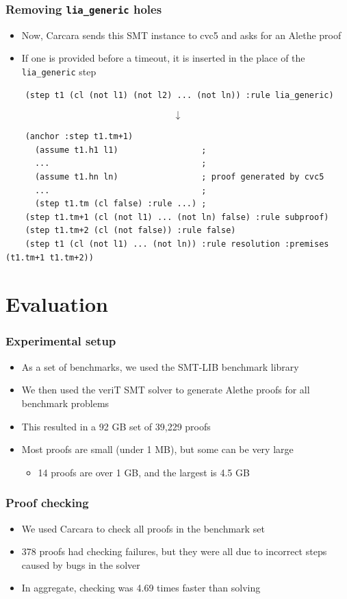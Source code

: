 \documentclass[usepdftitle=false,aspectratio=169]{beamer}
\newcommand\vitem{\vfill\item}
\begin{document}
\begin{frame}[fragile]
  \frametitle{Removing \texttt{lia\_generic} holes}
  \begin{itemize}
    \item Now, Carcara sends this SMT instance to cvc5 and asks for an Alethe
    proof
    \vitem If one is provided before a timeout, it is inserted in the place of
    the \texttt{lia\_generic} step
  \end{itemize}
  \vfill
  \begin{verbatim}
    (step t1 (cl (not l1) (not l2) ... (not ln)) :rule lia_generic)
  \end{verbatim}
  $$\downarrow$$
  \begin{verbatim}
    (anchor :step t1.tm+1)
      (assume t1.h1 l1)                 ;
      ...                               ;
      (assume t1.hn ln)                 ; proof generated by cvc5
      ...                               ;
      (step t1.tm (cl false) :rule ...) ;
    (step t1.tm+1 (cl (not l1) ... (not ln) false) :rule subproof)
    (step t1.tm+2 (cl (not false)) :rule false)
    (step t1 (cl (not l1) ... (not ln)) :rule resolution :premises (t1.tm+1 t1.tm+2))
  \end{verbatim}
\end{frame}

\section{Evaluation}

\begin{frame}
  \frametitle{Experimental setup}
  \begin{itemize}
    \item As a set of benchmarks, we used the SMT-LIB benchmark library
    \vitem We then used the veriT SMT solver to generate Alethe proofs for
    all benchmark problems
    \pause
    \vitem This resulted in a 92 GB set of 39,229 proofs
    \vitem Most proofs are small (under 1 MB), but some can be very large
    \begin{itemize}
      \item 14 proofs are over 1 GB, and the largest is 4.5 GB
    \end{itemize}
  \end{itemize}
\end{frame}

\begin{frame}
  \frametitle{Proof checking}
  \begin{itemize}
    \item We used Carcara to check all proofs in the benchmark set
    \vitem 378 proofs had checking failures, but they were all due to incorrect
    steps caused by bugs in the solver
    \vitem In aggregate, checking was 4.69 times faster than solving
  \end{itemize}
\end{frame}
\end{document}
